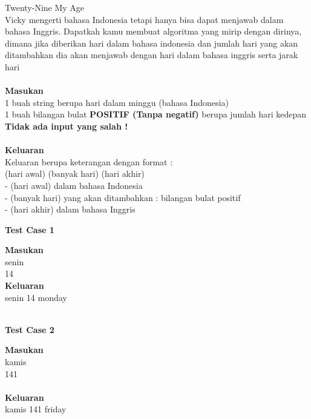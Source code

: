 \newpage
\begin{permasalahan}{Twenty-Nine My Age}\\
\label{prob:a29myage}
Vicky mengerti bahasa Indonesia tetapi hanya bisa dapat menjawab dalam bahasa Inggris. Dapatkah kamu membuat algoritma yang mirip dengan dirinya, dimana jika diberikan hari dalam bahasa indonesia dan jumlah hari yang akan ditambahkan dia akan menjawab dengan hari dalam bahasa inggris serta jarak hari\\\\
 
	\textbf{Masukan}\\
	1 buah string berupa hari dalam minggu (bahasa Indonesia)\\
	1 buah bilangan bulat \textbf{POSITIF (Tanpa negatif)} berupa jumlah hari kedepan \\
	\textbf{Tidak ada input yang salah !}\\\\
	\textbf{Keluaran}\\
	Keluaran berupa keterangan dengan format :\\
	(hari awal) (banyak hari) (hari akhir)\\
	- (hari awal) dalam bahasa Indonesia\\
	- (banyak hari) yang akan ditambahkan : bilangan bulat positif\\
	- (hari akhir) dalam bahasa Inggris \\

	\begin{center}
	\textbf{Test Case 1}\\
	\end{center}
	\textbf{Masukan}\\
	senin \\
	14 \\
	\textbf{Keluaran}\\
	senin 14 monday\\\\
	
	\begin{center}
	\textbf{Test Case 2}\\
	\end{center}
	\textbf{Masukan}\\
	kamis \\
	141 \\\\
	\textbf{Keluaran}\\
	kamis 141 friday\\\\



\end{permasalahan}
